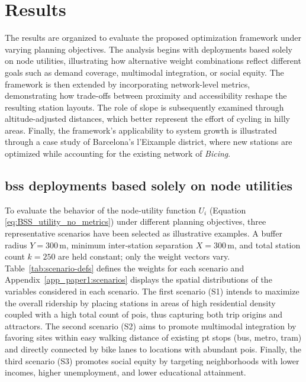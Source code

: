 \section{Results}

The results are organized to evaluate the proposed optimization framework under varying planning objectives. The analysis begins with deployments based solely on node utilities, illustrating how alternative weight combinations reflect different goals such as demand coverage, multimodal integration, or social equity. The framework is then extended by incorporating network-level metrics, demonstrating how trade-offs between proximity and accessibility reshape the resulting station layouts. The role of slope is subsequently examined through altitude-adjusted distances, which better represent the effort of cycling in hilly areas. Finally, the framework’s applicability to system growth is illustrated through a case study of Barcelona’s l'Eixample district, where new stations are optimized while accounting for the existing network of \textit{Bicing}.

    \subsection[BSS deployments based solely on node utilities]{\ac{bss} deployments based solely on node utilities}

    To evaluate the behavior of the node‐utility function \(U_{i}\) (Equation \ref{eq:BSS_utility_no_metrics}) under different planning objectives, three representative scenarios have been selected as illustrative examples. A buffer radius \(Y = 300\,\mathrm{m}\), minimum inter‐station separation \(X = 300\,\mathrm{m}\), and total station count \(k = 250\) are held constant; only the weight vectors vary. Table~\ref{tab:scenario-defs} defines the weights for each scenario and Appendix~\ref{app_paper1:scenarios} displays the spatial distributions of the variables considered in each scenario. The first scenario (S1) intends to maximize the overall ridership by placing stations in areas of high residential density coupled with a high total count of \acp{poi}, thus capturing both trip origins and attractors. The second scenario (S2) aims to promote multimodal integration by favoring sites within easy walking distance of existing \ac{pt} stops (bus, metro, tram) and directly connected by bike lanes to locations with abundant \acp{poi}. Finally, the third scenario (S3) promotes social equity by targeting neighborhoods with lower incomes, higher unemployment, and lower educational attainment.

